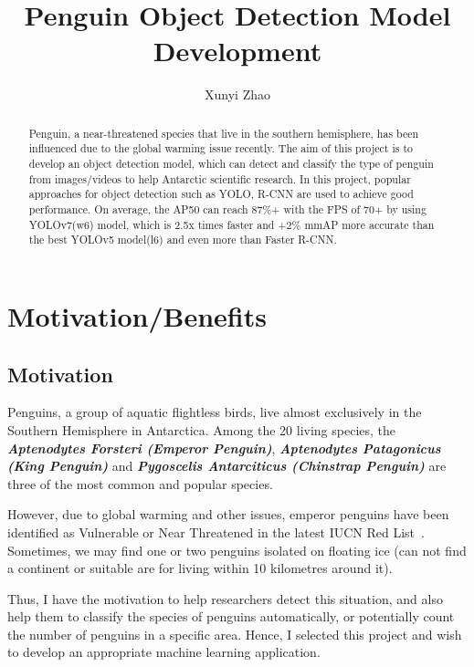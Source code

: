 \documentclass[runningheads]{llncs}
\begin{document}
%
\title{Penguin Object Detection Model Development}

\author{Xunyi Zhao}
%
\maketitle
%
\begin{abstract}
Penguin, a near-threatened species that live in the southern hemisphere, has been influenced due to the global warming issue recently. The aim of this project is to develop an object detection model, which can detect and classify the type of penguin from images/videos to help Antarctic scientific research. In this project, popular approaches for object detection such as YOLO, R-CNN are used to achieve good performance. On average, the AP50 can reach 87\%+ with the FPS of 70+ by using YOLOv7(w6) model, which is 2.5x times faster and +2\% mmAP more accurate than the best YOLOv5 model(l6) and even more than Faster R-CNN.

\end{abstract}
%
%

\section{Motivation/Benefits}
\subsection{Motivation}
Penguins, a group of aquatic flightless birds, live almost exclusively in the Southern Hemisphere in Antarctica. Among the 20 living species, the \textbf{\textit{Aptenodytes Forsteri (Emperor Penguin)}}, \textbf{\textit{Aptenodytes Patagonicus (King Penguin)}} and \textbf{\textit{Pygoscelis Antarciticus (Chinstrap Penguin)}} are three of the most common and popular species. 

However, due to global warming and other issues, emperor penguins have been identified as Vulnerable or Near Threatened in the latest IUCN Red List~\cite{ref_red_list}. Sometimes, we may find one or two penguins isolated on floating ice (can not find a continent or suitable are for living within 10 kilometres around it).

Thus, I have the motivation to help researchers detect this situation, and also help them to classify the species of penguins automatically, or potentially count the number of penguins in a specific area. Hence, I selected this project and wish to develop an appropriate machine learning application.
\end{document}
